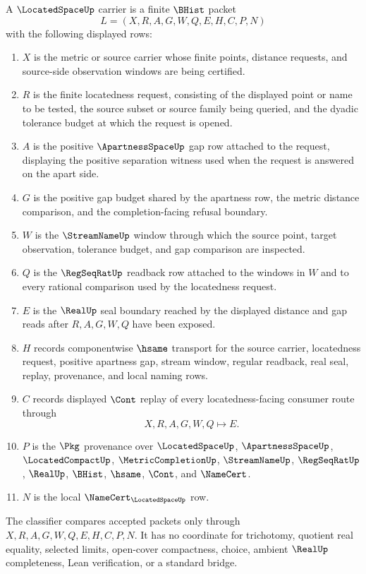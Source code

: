 \begin{definition}
\label{def:located-space-carrier}
A $\LocatedSpaceUp$ carrier is a finite $\BHist$ packet
$$
L=(X,R,A,G,W,Q,E,H,C,P,N)
$$
with the following displayed rows:
\begin{enumerate}
\item $X$ is the metric or source carrier whose finite points, distance requests, and source-side observation windows are being certified.
\item $R$ is the finite locatedness request, consisting of the displayed point or name to be tested, the source subset or source family being queried, and the dyadic tolerance budget at which the request is opened.
\item $A$ is the positive $\ApartnessSpaceUp$ gap row attached to the request, displaying the positive separation witness used when the request is answered on the apart side.
\item $G$ is the positive gap budget shared by the apartness row, the metric distance comparison, and the completion-facing refusal boundary.
\item $W$ is the $\StreamNameUp$ window through which the source point, target observation, tolerance budget, and gap comparison are inspected.
\item $Q$ is the $\RegSeqRatUp$ readback row attached to the windows in $W$ and to every rational comparison used by the locatedness request.
\item $E$ is the $\RealUp$ seal boundary reached by the displayed distance and gap reads after $R,A,G,W,Q$ have been exposed.
\item $H$ records componentwise $\hsame$ transport for the source carrier, locatedness request, positive apartness gap, stream window, regular readback, real seal, replay, provenance, and local naming rows.
\item $C$ records displayed $\Cont$ replay of every locatedness-facing consumer route through
$$
X,R,A,G,W,Q \longmapsto E .
$$
\item $P$ is the $\Pkg$ provenance over $\LocatedSpaceUp$, $\ApartnessSpaceUp$, $\LocatedCompactUp$, $\MetricCompletionUp$, $\StreamNameUp$, $\RegSeqRatUp$, $\RealUp$, $\BHist$, $\hsame$, $\Cont$, and $\NameCert$.
\item $N$ is the local $\NameCert_{\LocatedSpaceUp}$ row.
\end{enumerate}
The classifier compares accepted packets only through $X,R,A,G,W,Q,E,H,C,P,N$. It has no coordinate for trichotomy, quotient real equality, selected limits, open-cover compactness, choice, ambient $\RealUp$ completeness, Lean verification, or a standard bridge.
\end{definition}

